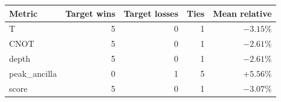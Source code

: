 \begin{tabular}{lrrrr}
\toprule
Metric & Target wins & Target losses & Ties & Mean relative \\
\midrule
T & 5 & 0 & 1 & $-3.15\%$ \\
CNOT & 5 & 0 & 1 & $-2.61\%$ \\
depth & 5 & 0 & 1 & $-2.61\%$ \\
peak_ancilla & 0 & 1 & 5 & $+5.56\%$ \\
score & 5 & 0 & 1 & $-3.07\%$ \\
\bottomrule
\end{tabular}
